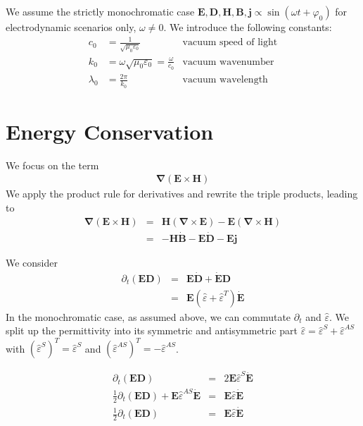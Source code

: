 \documentclass[12pt,a4paper,twoside,openright,BCOR10mm,headsepline,titlepage,abstracton,chapterprefix,final]{scrreprt}
\newcommand\Vector[1]{{\mathbf{#1}}}
\newcommand\vacuum{0}
\newcommand\wavenumber{k}
\newcommand\Nabla{\Vector{\nabla}}
\newcommand\timederivative[1]{\dot{{#1}}}
\newcommand\Tensor[1]{\hat{#1}}
\newcommand\scalarEfield{E}
\newcommand\scalarBfield{B}
\newcommand\scalarHfield{H}
\newcommand\scalarDfield{D}
\newcommand\Efield{\Vector{\scalarEfield}}
\newcommand\Bfield{\Vector{\scalarBfield}}
\newcommand\Hfield{\Vector{\scalarHfield}}
\newcommand\Dfield{\Vector{\scalarDfield}}
\newcommand\vacuumpermeability{\scalarpermeability_{\vacuum}}
\newcommand\scalarpermeability{\mu}
\newcommand\permittivity{\Tensor{\scalarpermittivity}}
\newcommand\vacuumpermittivity{\scalarpermittivity_{\vacuum}}
\newcommand\scalarpermittivity{\varepsilon}
\newcommand\currentdensity{\Vector{j}}
\begin{document}
We assume the strictly monochromatic case $\Efield,\Dfield,\Hfield,\Bfield, \currentdensity \propto \sin(\omega t + \varphi_0)$ for electrodynamic scenarios only, $\omega \neq 0$.
We introduce the following constants:
\begin{align}
 c_\vacuum &= \frac{1}{\sqrt{\vacuumpermeability\vacuumpermittivity}} & \textrm{vacuum speed of light} \\
 \wavenumber_\vacuum &= \omega \sqrt{\vacuumpermeability\vacuumpermittivity} = \frac{\omega}{c_\vacuum}& \textrm{vacuum wavenumber} \\
 \lambda_\vacuum &= \frac{2\pi}{\wavenumber_\vacuum} & \textrm{vacuum wavelength}
\end{align}

\section{Energy Conservation}
We focus on the term
\begin{eqnarray}
   \Nabla ( \Efield \times \Hfield )
\end{eqnarray}
We apply the product rule for derivatives and rewrite the triple products, leading to
\begin{eqnarray}
   \Nabla ( \Efield \times \Hfield ) &=& \Hfield ( \Nabla \times \Efield ) - \Efield ( \Nabla \times \Hfield ) \\
   &=& - \Hfield \timederivative{\Bfield} - \Efield  \timederivative{\Dfield} - \Efield \currentdensity
\end{eqnarray}

We consider
\begin{eqnarray}
 \partial_t (\Efield \Dfield) &=& \Efield  \timederivative{\Dfield} +  \timederivative{\Efield} \Dfield \\
                              &=& \Efield ( \permittivity + \permittivity^T ) \timederivative{\Efield} 
\end{eqnarray}
In the monochromatic case, as assumed above, we can commutate $\partial_t$ and $\permittivity$.
We split up the permittivity into its symmetric and antisymmetric part $\permittivity =  \permittivity^S +  \permittivity^{AS}$ with
$(\permittivity^S)^T = \permittivity^S$ and $(\permittivity^{AS})^T = - \permittivity^{AS}$. 

\begin{eqnarray}
 \partial_t (\Efield \Dfield)                                                                  &=& 2 \Efield \permittivity^S \timederivative{\Efield} \\
 \frac{1}{2} \partial_t (\Efield \Dfield)+ \Efield \permittivity^{AS} \timederivative{\Efield} &=&   \Efield  \permittivity \timederivative{\Efield} \\
 \frac{1}{2} \partial_t (\Efield \Dfield)                                                      &=&   \Efield  \permittivity \timederivative{\Efield}
\end{eqnarray}
\end{document}
